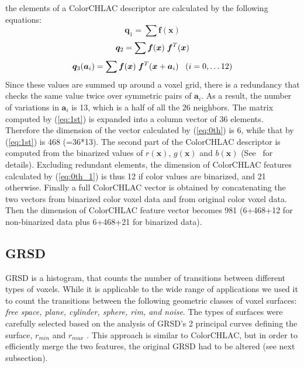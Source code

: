 \documentclass[conference]{sty/IEEEtran}
\begin{document}
the elements of a ColorCHLAC descriptor are calculated by the following equations:
\begin{equation}\label{eq:0th}
  {\bm q_1} = \sum \bm{f}({\bm x})
\end{equation}
\begin{equation}\label{eq:0th_1}
  {\bm q_2} = \sum \bm{f}({\bm x}) \hspace{1mm}\bm{f}^T({\bm x}) \\
\end{equation}
\begin{equation}\label{eq:1st}
  {\bm q_3}({\bm a}_i) = \sum \bm{f}({\bm x}) \hspace{1mm}\bm{f}^T({\bm x}+{\bm a_i}) \;\;\; (i=0, \dots 12) \\
\end{equation}
%
Since these values are summed up around a voxel grid, there is a redundancy that checks 
the same value twice over symmetric pairs of ${\bm a_i}$. 
As a result, the number of variations in ${\bm a_i}$ is 13, which is a half of all the 26 neighbors.
The matrix computed by (\ref{eq:1st}) is expanded into a column vector of 36 elements.
Therefore the dimension of the vector calculated by (\ref{eq:0th}) is 6, while that by 
(\ref{eq:1st}) is 468 (=36*13).
The second part of the ColorCHLAC descriptor is computed from the binarized values of $r(\bm{x})$, $g(\bm{x})$ 
and $b(\bm{x})$ (See~\cite{kanezaki2010icra} for details). 
Excluding redundant elements, the dimension of ColorCHLAC features calculated by (\ref{eq:0th_1}) 
is thus 12 if color values are binarized, and 21 otherwise. 
Finally a full ColorCHLAC vector is obtained by concatenating the two vectors from binarized 
color voxel data and from original color voxel data. Then the dimension of ColorCHLAC feature vector 
becomes 981 (6+468+12 for non-binarized data plus 6+468+21 for binarized data). 

\subsection{GRSD}
\label{sec:grsd}
GRSD is a histogram, that counts the number of transitions between different types of voxels.
While it is applicable to the wide range of applications we used it to count the transitions between 
the following geometric classes of voxel surfaces: \emph{free space, plane, cylinder, sphere, rim, and noise}.
The types of surfaces were carefully selected based on the analysis of GRSD's   
2 principal curves defining the surface, $r_{min}$ and $r_{max}$ \cite{Marton10IROS}.
This approach is similar to ColorCHLAC, but in order to efficiently merge the two features, 
the original GRSD had to be altered (see next subsection). 
\end{document}

